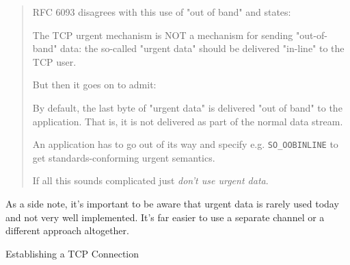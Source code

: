 \begin{quote}
  RFC 6093 disagrees with this use of "out of band" and states:

  The TCP urgent mechanism is NOT a mechanism for sending "out-of-band" data: the
  so-called "urgent data" should be delivered "in-line" to the TCP user.

  But then it goes on to admit:

  By default, the last byte of "urgent data" is delivered "out of band" to the
  application. That is, it is not delivered as part of the normal data stream.

  An application has to go out of its way and specify e.g. \texttt{SO\_OOBINLINE} to get
  standards-conforming urgent semantics.

  If all this sounds complicated just \emph{don't use urgent data}.
\end{quote}

As a side note, it's important to be aware that urgent data is rarely used today and not very well implemented. It's far easier to use a separate channel or a different approach altogether.

\begin{frame}{Establishing a TCP Connection}
  \begin{center}
  \end{center}
  \label{fig:3way}
\end{frame}

